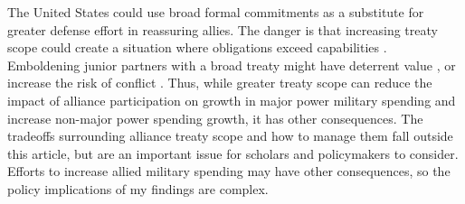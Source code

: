 \documentclass[12pt]{article}
\begin{document}
The United States could use broad formal commitments as a substitute for greater defense effort in reassuring allies.
The danger is that increasing treaty scope could create a situation where obligations exceed capabilities \citep{Kennedy1987}. 
Emboldening junior partners with a broad treaty might have deterrent value \citep{Bensonetal2014}, or increase the risk of conflict \citep{Benson2012}.
Thus, while greater treaty scope can reduce the impact of alliance participation on growth in major power military spending and increase non-major power spending growth, it has other consequences. 
The tradeoffs surrounding alliance treaty scope and how to manage them fall outside this article, but are an important issue for scholars and policymakers to consider. 
Efforts to increase allied military spending may have other consequences, so the policy implications of my findings are complex. 

 



\singlespace
 
 
\end{document}
